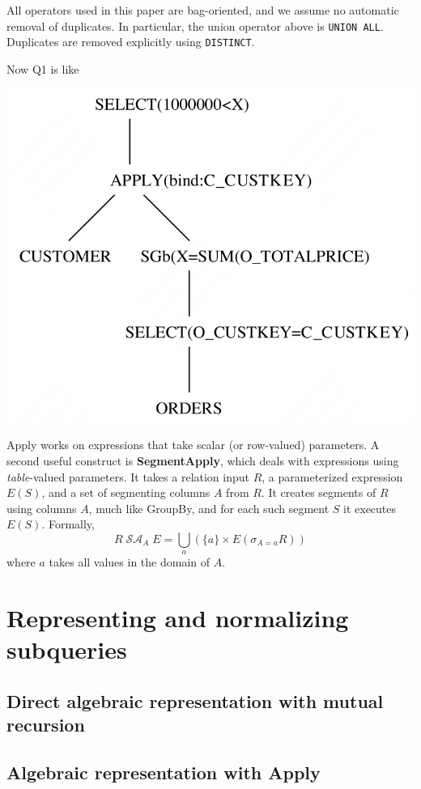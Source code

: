 \documentclass[11pt]{article}
\DeclareMathOperator{\SA}{\mathcal{SA}}
\begin{document}
All operators used in this paper are bag-oriented, and we assume no automatic removal of duplicates.
In particular, the union operator above is \texttt{UNION ALL}. Duplicates are removed explicitly using
\texttt{DISTINCT}.

Now Q1 is like
\begin{center}
\includegraphics[width=.5\textwidth]{../../images/papers/96.png}
\end{center}

Apply works on expressions that take scalar (or row-valued) parameters. A second useful construct is
\textbf{SegmentApply}, which deals with expressions using \emph{table}-valued parameters. It takes a relation input
\(R\), a parameterized expression \(E(S)\), and a set of segmenting columns \(A\) from \(R\). It
creates segments of \(R\) using columns \(A\), much like GroupBy, and for each such segment \(S\) it
executes \(E(S)\). Formally,
\begin{equation*}
R\SA_AE=\bigcup_{a}(\{a\}\times E(\sigma_{A=a}R))
\end{equation*}
where \(a\) takes all values in the domain of \(A\).
\section{Representing and normalizing subqueries}
\label{sec:orgc5e1c11}
\subsection{Direct algebraic representation with mutual recursion}
\label{sec:orgae05b9b}
\subsection{Algebraic representation with Apply}
\label{sec:orge4f5d82}
\end{document}
